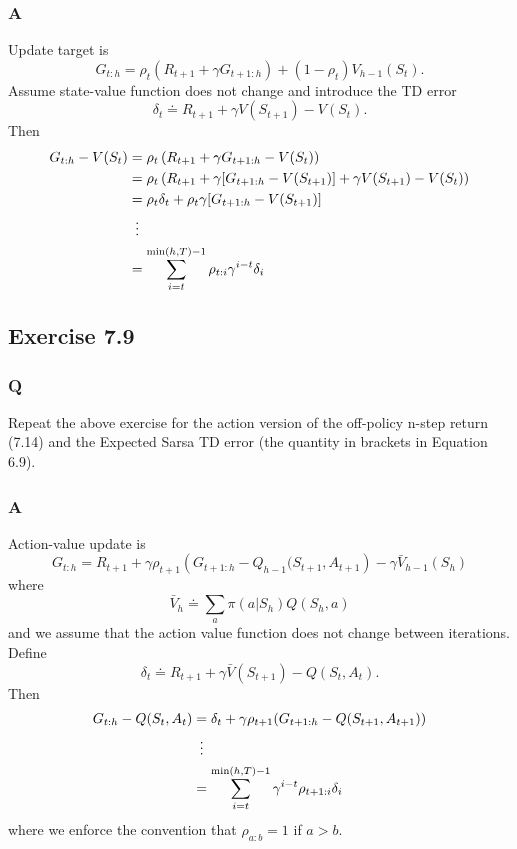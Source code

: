 \subsubsection*{A}
Update target is
\[
    G_{t:h} = \rho_t (R_{t+1} + \gamma G_{t+1:h}) + (1 - \rho_t) V_{h-1}(S_t).
\]
Assume state-value function does not change and introduce the TD error
\[
    \delta_t \doteq R_{t+1} + \gamma V(S_{t+1}) - V(S_t).
\]
Then
\begin{align*}
    G_{t:h} - V(S_t) &= \rho_t \left( R_{t+1} + \gamma G_{t+1:h} - V(S_t) \right) \\
                     &= \rho_t \left( R_{t+1} + \gamma [G_{t+1:h} - V(S_{t+1})] + \gamma V(S_{t+1})  - V(S_t) \right) \\
                     &= \rho_t \delta_t + \rho_t \gamma[G_{t+1:h} - V(S_{t+1})] \\
                     &\vdotswithin{=}\\
                     &= \sum_{i=t}^{\textrm{min}(h, T)-1}\rho_{t:i}\gamma^{i-t}\delta_i
\end{align*}


\subsection{Exercise 7.9}
\subsubsection*{Q}
Repeat the above exercise for the action version of the off-policy n-step return (7.14) and the Expected Sarsa TD error (the quantity in brackets in Equation 6.9).
\subsubsection*{A}
Action-value update is 
\[
    G_{t:h} = R_{t+1} + \gamma \rho_{t+1} \left(G_{t+1:h} - Q_{h-1}(S_{t+1}, A_{t+1}\right) - \gamma \bar{V}_{h-1}(S_h)
\]
where
\[
    \bar{V}_h \doteq \sum_a \pi(a \vert S_h)Q(S_h, a)
\]
and we assume that the action value function does not change between iterations. Define
\[
    \delta_t \doteq R_{t+1} + \gamma \bar{V}(S_{t+1}) - Q(S_t, A_t).
\]
Then
\begin{align*}
    G_{t:h} - Q(S_t, A_t) &= \delta_t + \gamma \rho_{t+1}(G_{t+1:h} - Q(S_{t+1}, A_{t+1})) \\
                          &\vdotswithin{=}\\
                          &=\sum_{i=t}^{\textrm{min}(h, T)-1}\gamma^{i-t}\rho_{t+1:i}\delta_i
\end{align*}
where we enforce the convention that $\rho_{a:b} = 1$ if $a > b$.

